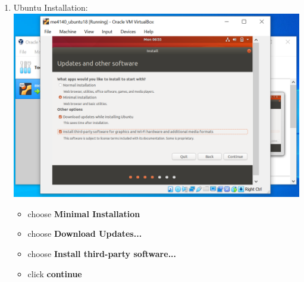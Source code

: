 \documentclass[12pt]{article}
\begin{document}
\begin{description}
\begin{description}
\begin{enumerate}
\begin{itemize}
            \end{itemize}
\vspace{10mm}
\item Ubuntu Installation: \vspace{5mm} \\
      		\hspace*{-2.5cm}\includegraphics[scale=.6]{Capture15.png}\\
             \begin{itemize}
                    
                 \item choose {\bf Minimal Installation}
                 \item choose {\bf Download Updates...}           
                 \item choose {\bf Install third-party software...}  
                 \item click {\bf continue}     
            \end{itemize}


\end{enumerate}
\end{description}
\end{description}
\end{document}
